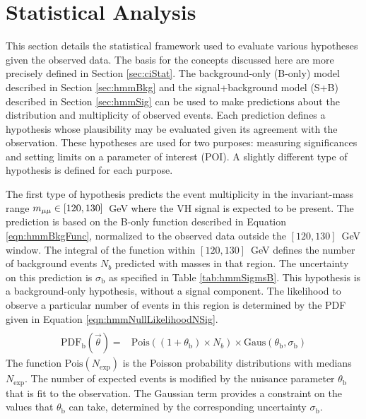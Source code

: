 \section{Statistical Analysis}\label{sec:hmmStat}

This section details the statistical framework used to evaluate various hypotheses given the observed data.
The basis for the concepts discussed here are more precisely defined in Section \ref{sec:ciStat}.
The background-only (B-only) model described in Section \ref{sec:hmmBkg} and the signal+background model (S+B) described in Section \ref{sec:hmmSig} can be used to make predictions about the \muu distribution and multiplicity of observed events.
Each prediction defines a hypothesis whose plausibility may be evaluated given its agreement with the observation.
These hypotheses are used for two purposes: measuring significances and setting limits on a parameter of interest (POI).
A slightly different type of hypothesis is defined for each purpose.

The first type of hypothesis predicts the event multiplicity in the invariant-mass range $m_{\mu\mu}\in[120,130]$~GeV where the VH signal is expected to be present.
The prediction is based on the B-only function described in Equation \ref{eqn:hmmBkgFunc}, normalized to the observed data outside the $[120,130]$~GeV window.
The integral of the function within $[120,130]$~GeV defines the number of background events $N_b$ predicted with masses in that region.
The uncertainty on this prediction is $\sigma_\text{b}$ as specified in Table \ref{tab:hmmSigmsB}.
This hypothesis is a background-only hypothesis, without a signal component.
The likelihood to observe a particular number of events in this region is determined by the PDF given in Equation \ref{eqn:hmmNullLikelihoodNSig}.
\begin{equation}\begin{split}\label{eqn:hmmNullLikelihoodNSig}\\
\text{PDF}_\text{b}(\vec{\theta}) =& \text{Pois}((1+\theta_\text{b})\times N_b) \times \text{Gaus}(\theta_\text{b},\sigma_\text{b}) 
\end{split}\end{equation} 
The function $\text{Pois}(N_\text{exp})$ is the Poisson probability distributions with medians $N_\text{exp}$.
The number of expected events is modified by the nuisance parameter $\theta_\text{b}$ that is fit to the observation.
The Gaussian term provides a constraint on the values that $\theta_\text{b}$ can take, determined by the corresponding uncertainty $\sigma_\text{b}$.

